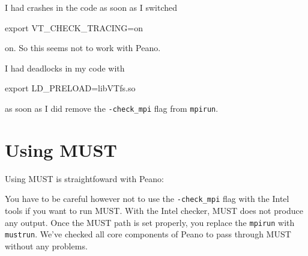 \begin{remark}
 I had crashes in the code as soon as I switched
 \begin{code}
 export VT_CHECK_TRACING=on
 \end{code}
 on. So this seems not to work with Peano.
\end{remark}



\begin{remark}
 I had deadlocks in my code with
 \begin{code}
 export LD_PRELOAD=libVTfs.so
 \end{code}
 as soon as I did remove the \texttt{-check\_mpi} flag from \texttt{mpirun}.
\end{remark}




\section{Using MUST}
\label{section:supercomputers:MUST}

Using MUST is straightfoward with Peano:


\noindent
You have to be careful however not to use the \texttt{-check\_mpi} flag with the
Intel tools if you want to run MUST.
With the Intel checker, MUST does not produce any output.
Once the MUST path is set properly, you replace the \texttt{mpirun} with
\texttt{mustrun}.
We've checked all core components of Peano to pass through MUST without any
problems.


% 
% 

 
% 
% 
% 
% 
% 
% 
% 
% 
% 
% 
% 
% 
% 
